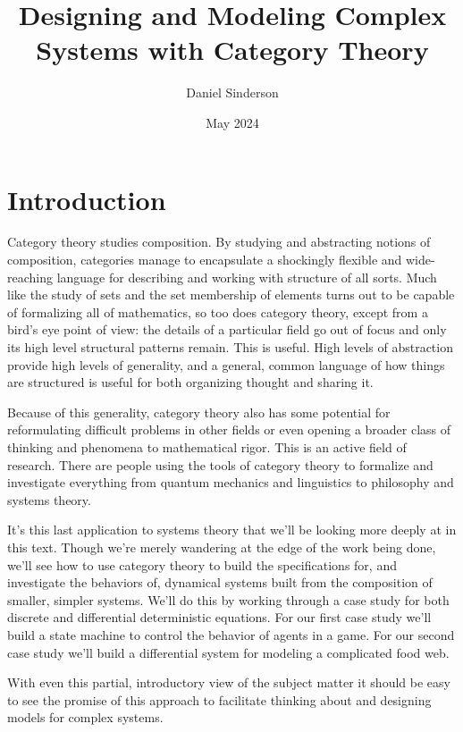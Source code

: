 \documentclass[12pt]{article}
\title{Designing and Modeling Complex Systems with Category Theory}
\author{Daniel Sinderson}
\date{May 2024}
\theoremstyle{definition}
\begin{document}
\maketitle






\section*{Introduction}
Category theory studies composition.
By studying and abstracting notions of composition, categories manage to encapsulate
a shockingly flexible and wide-reaching language for describing and working with structure of all sorts.
Much like the study of sets and the set membership of elements turns out to be capable of formalizing all of mathematics,
so too does category theory, except from a bird's eye point of view:
the details of a particular field go out of focus and only its high level structural patterns remain.
This is useful.
High levels of abstraction provide high levels of generality,
and a general, common language of how things are structured is useful for both organizing thought and sharing it.

Because of this generality, category theory also has some potential for
reformulating difficult problems in other fields or even
opening a broader class of thinking and phenomena to mathematical rigor.
This is an active field of research.
There are people using the tools of category theory to formalize and investigate everything from quantum mechanics and linguistics to philosophy and systems theory.

It's this last application to systems theory that we'll be looking more deeply at in this text.
Though we're merely wandering at the edge of the work being done, we'll see how to use category theory to build the specifications for, and investigate the behaviors of, dynamical systems built from the composition of smaller, simpler systems.
We'll do this by working through a case study for both discrete and differential deterministic equations.
For our first case study we'll build a state machine to control the behavior of agents in a game.
For our second case study we'll build a differential system for modeling a complicated food web.

With even this partial, introductory view of the subject matter
it should be easy to see the promise of this approach to facilitate thinking about
and designing models for complex systems.
\end{document}
